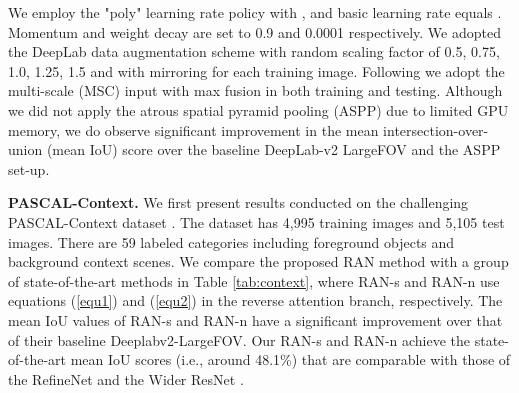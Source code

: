 \documentclass[runningheads]{llncs}
\begin{document}
We employ the "poly" learning rate policy with
, and basic learning rate equals . Momentum and weight decay are set to 0.9 and 
0.0001 respectively. We adopted the DeepLab data augmentation scheme with random
scaling factor of 0.5, 0.75, 1.0, 1.25, 1.5 and with mirroring for each
training image. Following \cite{chen2016deeplab} we adopt the multi-scale (MSC) input with max fusion
in both training and testing. Although we did not apply the
atrous spatial pyramid pooling (ASPP) due to limited GPU memory, we do
observe significant improvement in the mean intersection-over-union
(mean IoU) score over the baseline DeepLab-v2 LargeFOV and the ASPP
set-up. 


\begin{table*}[t]
\centering
{}
\caption{Ablation study of different RANs on the PASCAL-Context
dataset to evaluate the benefit of proposed RAN. We compare the results under different network set-up with employing dilated decision conv filters, 
data augmentation, the MSC design and the CRF post-processing.}
\label{tab:ablation}
\end{table*}
{\bf PASCAL-Context.} We first present results conducted on the
challenging PASCAL-Context dataset \cite{mottaghi2014role}. The dataset
has 4,995 training images and 5,105 test images. There are 59 labeled
categories including foreground objects and background context scenes.
We compare the proposed RAN method with a group of state-of-the-art
methods in Table \ref{tab:context}, where RAN-s and RAN-n use
equations (\ref{equ1}) and (\ref{equ2}) in the reverse attention branch,
respectively.  The mean IoU values of RAN-s and RAN-n have a significant improvement
over that of their baseline Deeplabv2-LargeFOV. Our
RAN-s and RAN-n achieve the state-of-the-art mean IoU scores (i.e.,
around 48.1\%) that are comparable with those of the RefineNet
\cite{lin2016refinenet} and the Wider ResNet \cite{wu2016wider}. 
\end{document}

